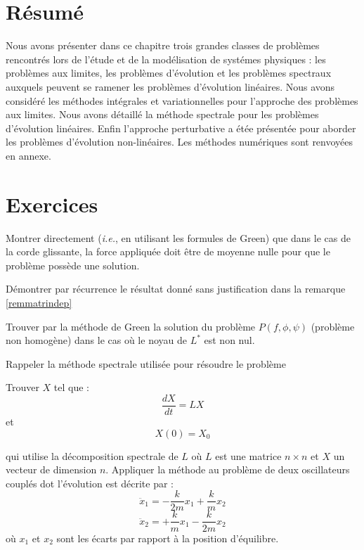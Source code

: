 \documentclass[12pt]{book}
\begin{document}
\section{R\'esum\'e}
Nous avons pr\'esenter dans ce chapitre trois grandes classes de probl\`emes
rencontr\'es 
lors de l'\'etude et de la mod\'elisation de syst\'emes physiques :
les probl\`emes aux limites, les probl\`emes d'\'evolution et les probl\`emes
spectraux auxquels peuvent se ramener les probl\`emes d'\'evolution
lin\'eaires. 
Nous avons consid\'er\'e les m\'ethodes int\'egrales et variationnelles pour
l'approche des probl\`emes aux limites. Nous avons d\'etaill\'e la m\'ethode
spectrale pour les probl\`emes d'\'evolution lin\'eaires.
Enfin l'approche perturbative a \'et\'ee pr\'esent\'ee pour aborder les
probl\`emes d'\'evolution 
non-lin\'eaires. Les m\'ethodes num\'eriques sont renvoy\'ees en annexe.

\section{Exercices}

\begin{exo}
Montrer directement ({\it i.e.}, en utilisant les formules de Green) que dans
le cas de la corde glissante, la force appliqu\'ee doit \^etre de moyenne
nulle  pour que le probl\`eme poss\`ede une solution.
\end{exo}
\begin{exo}
 D\'emontrer par
r\'ecurrence le r\'esultat donn\'e sans justification dans la remarque \ref{remmatrindep}
\end{exo}

\begin{exo}
Trouver par la m\'ethode de Green la solution du probl\`eme $P(f,\phi,\psi)$
(probl\`eme non homog\`ene) dans le cas o\`u le noyau de $L^*$ est non nul.
\end{exo}


\begin{exo}\label{exospectramatrice}
Rappeler la m\'ethode  spectrale utilis\'ee pour r\'esoudre le probl\`eme 
\begin{prob}\label{proboscil}
Trouver $X$ tel que :
\begin{equation}\label{eqevol}
\frac{dX}{dt}=L X
\end{equation}
et
\begin{equation}
X(0)=X_0
\end{equation}
\end{prob}
qui utilise la d\'ecomposition spectrale de $L$ o\`u $L$ est une matrice $n
\times n$ et $X$ un vecteur de dimension $n$.
Appliquer la m\'ethode au probl\`eme de deux oscillateurs coupl\'es
dot l'\'evolution est d\'ecrite par :
\begin{equation}
\ddot x_1=-\frac{k}{2m}x_1+\frac{k}{m}x_2
\end{equation}
\begin{equation}
\ddot x_2=+\frac{k}{m}x_1-\frac{k}{2m}x_2
\end{equation}
o\`u $x_1$ et $x_2$ sont les \'ecarts par rapport \`a la position
d'\'equilibre. 
\end{exo}
\end{document}
